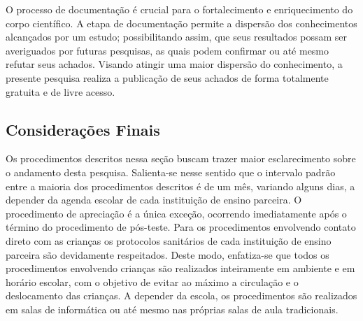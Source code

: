 O processo de documentação é crucial para o fortalecimento e enriquecimento do corpo científico. A etapa de documentação permite a dispersão dos conhecimentos alcançados por um estudo; possibilitando assim, que seus resultados possam ser averiguados por futuras pesquisas, as quais podem confirmar ou até mesmo refutar seus achados. Visando atingir uma maior dispersão do conhecimento, a presente pesquisa realiza a publicação de seus achados de forma totalmente gratuita e de livre acesso.


\subsection{Considerações Finais}\label{subsec:CF}

Os procedimentos descritos nessa seção buscam trazer maior esclarecimento sobre o andamento desta pesquisa. Salienta-se nesse sentido que o intervalo padrão entre a maioria dos procedimentos descritos é de um mês, variando alguns dias, a depender da agenda escolar de cada instituição de ensino parceira. O procedimento de apreciação é a única exceção, ocorrendo imediatamente após o término do procedimento de pós-teste. Para os procedimentos envolvendo contato direto com as crianças os protocolos sanitários de cada instituição de ensino parceira são devidamente respeitados. Deste modo, enfatiza-se que todos os procedimentos envolvendo crianças são realizados inteiramente em ambiente e em horário escolar, com o objetivo de evitar ao máximo a circulação e o deslocamento das crianças. A depender da escola, os procedimentos são realizados em salas de informática ou até mesmo nas próprias salas de aula tradicionais. 


